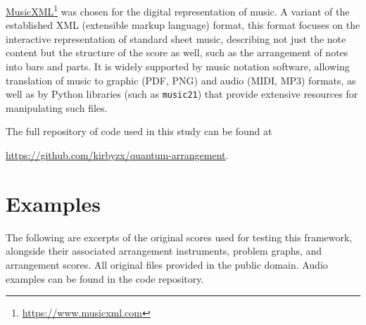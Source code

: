 \documentclass[12pt]{article}
\theoremstyle{definition}
\begin{document}
\href{https://www.musicxml.com}{MusicXML}\footnote{\url{https://www.musicxml.com}} was chosen for the digital representation of music. A variant of the established XML (extensible markup language) format, this format focuses on the interactive representation of standard sheet music, describing not just the note content but the structure of the score as well, such as the arrangement of notes into bars and parts. It is widely supported by music notation software, allowing translation of music to graphic (PDF, PNG) and audio (MIDI, MP3) formats, as well as by Python libraries (such as \texttt{music21}) that provide extensive resources for manipulating such files.

The full repository of code used in this study can be found at
\begin{center}
    \url{https://github.com/kirbyzx/quantum-arrangement}.
\end{center}

\section{Examples}
\label{app:examples}

The following are excerpts of the original scores used for testing this framework, alongside their associated arrangement instruments, problem graphs, and arrangement scores. All original files provided in the public domain. Audio examples can be found in the code repository.
\end{document}
